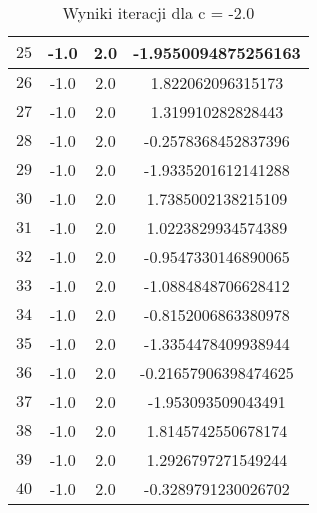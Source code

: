 \documentclass{article}
\begin{document}
\begin{table}[H]
\begin{tabular}{|c|c|c|c|}
\( 25 \) & -1.0 & 2.0 & -1.9550094875256163  \\ \hline
\( 26 \) & -1.0 & 2.0 & 1.822062096315173  \\ \hline
\( 27 \) & -1.0 & 2.0 & 1.319910282828443 \\ \hline
\( 28 \) & -1.0 & 2.0 & -0.2578368452837396  \\ \hline
\( 29 \) & -1.0 & 2.0 & -1.9335201612141288  \\ \hline
\( 30 \) & -1.0 & 2.0 & 1.7385002138215109  \\ \hline
\( 31 \) & -1.0 & 2.0 & 1.0223829934574389  \\ \hline
\( 32 \) & -1.0 & 2.0 & -0.9547330146890065  \\ \hline
\( 33 \) & -1.0 & 2.0 & -1.0884848706628412  \\ \hline
\( 34 \) & -1.0 & 2.0 & -0.8152006863380978  \\ \hline
\( 35 \) & -1.0 & 2.0 & -1.3354478409938944  \\ \hline
\( 36 \) & -1.0 & 2.0 & -0.21657906398474625  \\ \hline
\( 37 \) & -1.0 & 2.0 & -1.953093509043491  \\ \hline
\( 38 \) & -1.0 & 2.0 & 1.8145742550678174  \\ \hline
\( 39 \) & -1.0 & 2.0 & 1.2926797271549244  \\ \hline
\( 40 \) & -1.0 & 2.0 & -0.3289791230026702  \\ \hline
\end{tabular}
\caption{Wyniki iteracji dla c = -2.0}
\end{table}
\end{document}
